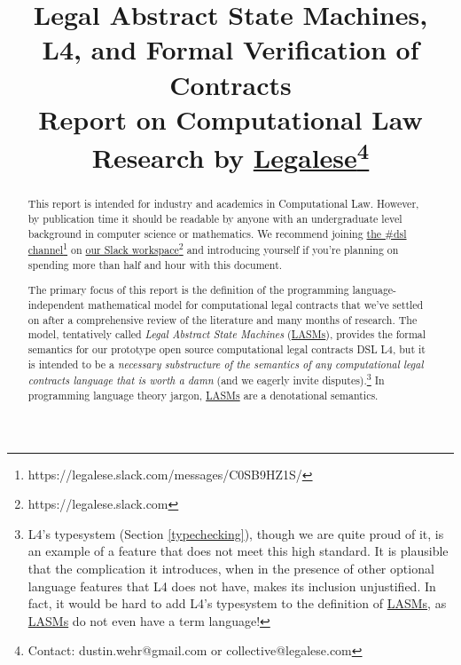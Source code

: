 \documentclass[12pt]{article}
\title{Legal Abstract State Machines, \\
L4, and Formal Verification of Contracts \\
\smaller \smaller Report on Computational Law Research by \href{https://legalese.com}{Legalese}\footnote{Contact: dustin.wehr@gmail.com or collective@legalese.com}\larger \larger }
\newcommand{\lasms}{{\sf \hyperref[LASM]{LASMs}}\xspace}
\begin{document}
\maketitle

\begin{abstract}
This report is intended for industry and academics in Computational Law. However, by publication time it should be readable by anyone with an undergraduate level background in computer science or mathematics. We recommend joining \href{https://legalese.slack.com/messages/C0SB9HZ1S/}{the \#dsl channel}\footnote{https://legalese.slack.com/messages/C0SB9HZ1S/} on \href{https://legalese.slack.com}{our Slack workspace}\footnote{https://legalese.slack.com} and introducing yourself if you're planning on spending more than half and hour with this document. %

The primary focus of this report is the definition of the programming language-independent mathematical model for computational legal contracts that we've settled on after a comprehensive review of the literature and many months of research. The model, tentatively called \textit{Legal Abstract State Machines} (\lasms), provides the formal semantics for our prototype open source computational legal contracts DSL L4, but it is intended to be a \textit{necessary substructure of the semantics of any computational legal contracts language that is worth a damn} (and we eagerly invite disputes).\footnote{L4's typesystem (Section \ref{typechecking}), though we are quite proud of it, is an example of a feature that does not meet this high standard. It is plausible that the complication it introduces, when in the presence of other optional language features that L4 does not have,  makes its inclusion unjustified.
In fact, it would be hard to add L4's typesystem to the definition of \lasms, as \lasms do not even have a term language!} In programming language theory jargon, \lasms are a denotational semantics.
\end{abstract}

\pagebreak

\tableofcontents


\end{document}
